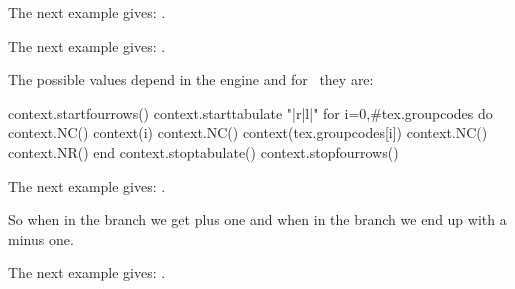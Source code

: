 \startbuffer
[\the\currentgrouplevel] \bgroup
    [\the\currentgrouplevel] \bgroup
        [\the\currentgrouplevel]
    \egroup [\the\currentgrouplevel]
\egroup [\the\currentgrouplevel]
\stopbuffer

The next example gives: \inlinebuffer.

\typebuffer

\stopoldprimitive

\startoldprimitive[title={\prm {currentgrouptype}}]

\startbuffer
[\the\currentgrouptype] \bgroup
    [\the\currentgrouptype] \begingroup
        [\the\currentgrouptype]
    \endgroup [\the\currentgrouptype]
    [\the\currentgrouptype] \beginmathgroup
        [\the\currentgrouptype]
    \endmathgroup [\the\currentgrouptype]
[\the\currentgrouptype] \egroup
\stopbuffer

The next example gives: \inlinebuffer.

\typebuffer

The possible values depend in the engine and for \LUAMETATEX\ they are:

\startluacode
context.startfourrows()
context.starttabulate { "|r|l|" }
for i=0,#tex.groupcodes do
    context.NC() context(i)
    context.NC() context(tex.groupcodes[i])
    context.NC() context.NR()
end
context.stoptabulate()
context.stopfourrows()
\stopluacode

\stopoldprimitive

\startoldprimitive[title={\prm {currentifbranch}}]

\startbuffer
[\the\currentifbranch] \iftrue
    [\the\currentifbranch] \iffalse
        [\the\currentifbranch]
    \else
        [\the\currentifbranch]
    \fi [\the\currentifbranch]
\fi [\the\currentifbranch]
\stopbuffer

The next example gives: \inlinebuffer.

\typebuffer

So when in the  branch we get plus one and when in the 
branch we end up with a minus one.

\stopoldprimitive

\startoldprimitive[title={\prm {currentiflevel}}]

\startbuffer
[\the\currentiflevel] \iftrue
    [\the\currentiflevel]\iftrue
        [\the\currentiflevel] \iftrue
            [\the\currentiflevel]
        \fi [\the\currentiflevel]
    \fi [\the\currentiflevel]
\fi [\the\currentiflevel]
\stopbuffer

The next example gives: \inlinebuffer.

